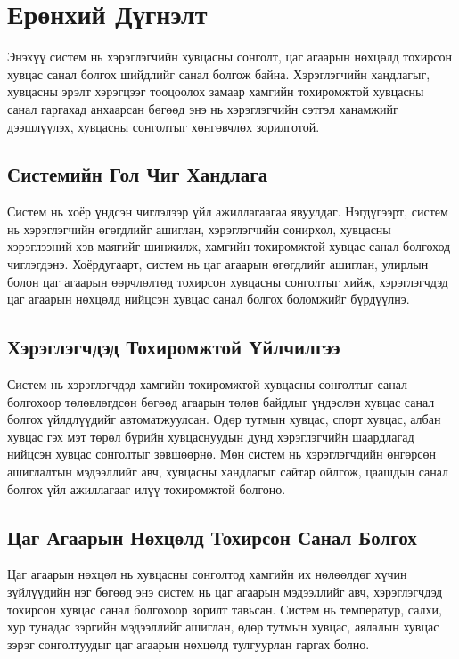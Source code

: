 \section{Ерөнхий Дүгнэлт}

Энэхүү систем нь хэрэглэгчийн хувцасны сонголт, цаг агаарын нөхцөлд тохирсон хувцас санал болгох шийдлийг санал болгож байна. Хэрэглэгчийн хандлагыг, хувцасны эрэлт хэрэгцээг тооцоолох замаар хамгийн тохиромжтой хувцасны санал гаргахад анхаарсан бөгөөд энэ нь хэрэглэгчийн сэтгэл ханамжийг дээшлүүлэх, хувцасны сонголтыг хөнгөвчлөх зорилготой.

\subsection{Системийн Гол Чиг Хандлага}
Систем нь хоёр үндсэн чиглэлээр үйл ажиллагаагаа явуулдаг. Нэгдүгээрт, систем нь хэрэглэгчийн өгөгдлийг ашиглан, хэрэглэгчийн сонирхол, хувцасны хэрэглээний хэв маягийг шинжилж, хамгийн тохиромжтой хувцас санал болгоход чиглэгдэнэ. Хоёрдугаарт, систем нь цаг агаарын өгөгдлийг ашиглан, улирлын болон цаг агаарын өөрчлөлтөд тохирсон хувцасны сонголтыг хийж, хэрэглэгчдэд цаг агаарын нөхцөлд нийцсэн хувцас санал болгох боломжийг бүрдүүлнэ.

\subsection{Хэрэглэгчдэд Тохиромжтой Үйлчилгээ}
Систем нь хэрэглэгчдэд хамгийн тохиромжтой хувцасны сонголтыг санал болгохоор төлөвлөгдсөн бөгөөд агаарын төлөв байдлыг үндэслэн хувцас санал болгох үйлдлүүдийг автоматжуулсан. Өдөр тутмын хувцас, спорт хувцас, албан хувцас гэх мэт төрөл бүрийн хувцаснуудын дунд хэрэглэгчийн шаардлагад нийцсэн хувцас сонголтыг зөвшөөрнө. Мөн систем нь хэрэглэгчдийн өнгөрсөн ашиглалтын мэдээллийг авч, хувцасны хандлагыг сайтар ойлгож, цаашдын санал болгох үйл ажиллагааг илүү тохиромжтой болгоно.

\subsection{Цаг Агаарын Нөхцөлд Тохирсон Санал Болгох}
Цаг агаарын нөхцөл нь хувцасны сонголтод хамгийн их нөлөөлдөг хүчин зүйлүүдийн нэг бөгөөд энэ систем нь цаг агаарын мэдээллийг авч, хэрэглэгчдэд тохирсон хувцас санал болгохоор зорилт тавьсан. Систем нь температур, салхи, хур тунадас зэргийн мэдээллийг ашиглан, өдөр тутмын хувцас, аялалын хувцас зэрэг сонголтуудыг цаг агаарын нөхцөлд тулгуурлан гаргах болно.

